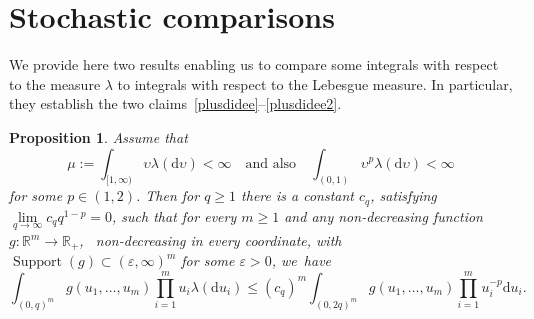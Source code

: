 \documentclass[JEP,XML,SOM,Unicode,published]{cedram}
\newtheorem{proposition}[theorem]{Proposition}
\theoremstyle{definition}
\newcommand{\dd}{\mathrm{d}}
\DeclareMathOperator*{\supp}{\mathrm{Support}}
\newcommand{\bbR}{{\ensuremath{\mathbb R}} }
\let\gep\varepsilon
\let\ups\upsilon
\begin{document}
\section{Stochastic comparisons}

We provide here
two results enabling us to compare some integrals
with respect to the measure $\lambda$ to integrals with respect
to the Lebesgue measure.
In particular, they establish the two claims~\eqref{plusdidee}--\eqref{plusdidee2}.

\begin{proposition}
\label{prop:compare1}
Assume that
\[
\mu:=\int_{[1,\infty)} \ups \lambda(\dd \ups) <\infty\quad\text{and also}\quad \int_{(0,1)} \ups^p \lambda(\dd \ups) <\infty
\]
for some $p \in (1,2)$. Then for $q\geq 1$ there is
a constant $c_q$, satisfying $\lim\limits_{q\to\infty} c_q q^{1-p} =0$,
such that for every $m\geq 1$ and any non-decreasing function $g:\bbR^m \to \bbR_+$, \ie \ non-decreasing in every coordinate, with $\supp(g)\subset (\gep,\infty)^m$ for some $\gep>0$, we~have
\[
\int_{(0,q)^m} g(u_1, \ldots, u_m) \prod_{i=1}^m u_i \lambda(\dd u_i) \leq (c_q)^m \int_{(0,2q)^m} g(u_1, \ldots, u_m) \prod_{i=1}^m u_i^{-p} \dd u_i.
\]
\end{proposition}
\end{document}
